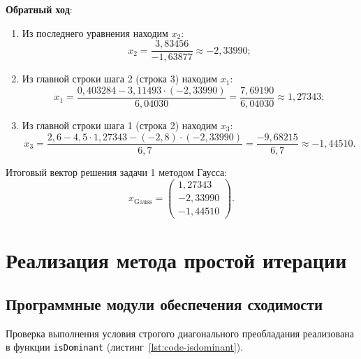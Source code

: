 \textbf{Обратный ход}:
\begin{enumerate}
    \item Из последнего уравнения находим $x_2$:
    \begin{equation*}
        x_2 = \frac{3{,}83456}{-1{,}63877} \approx -2{,}33990;
    \end{equation*}
    \item Из главной строки шага 2 (строка 3) находим $x_1$:
    \begin{equation*}
        x_1 = \frac{0{,}403284 - 3{,}11493 \cdot (-2{,}33990)}{6{,}04030} = \frac{7{,}69190}{6{,}04030} \approx 1{,}27343;
    \end{equation*}
    \item Из главной строки шага 1 (строка 2) находим $x_3$:
    \begin{equation*}
        x_3 = \frac{2{,}6 - 4{,}5 \cdot 1{,}27343 - (-2{,}8) \cdot (-2{,}33990)}{6{,}7} = \frac{-9{,}68215}{6{,}7} \approx -1{,}44510.
    \end{equation*}
\end{enumerate}

Итоговый вектор решения задачи 1 методом Гаусса:
\begin{equation}
    x_{\text{Gauss}} = \begin{pmatrix} 1{,}27343 \\ -2{,}33990 \\ -1{,}44510 \end{pmatrix}.
    \label{eq:sol_gauss}
\end{equation}

\section{Реализация метода простой итерации}

\subsection{Программные модули обеспечения сходимости}

Проверка выполнения условия строгого диагонального преобладания реализована в функции \texttt{isDominant} (листинг~\ref{lst:code-isdominant}).

\begin{listing}[H]
    \caption{Функция isDominant для проверки диагонального преобладания}
    \label{lst:code-isdominant}
\end{listing}

